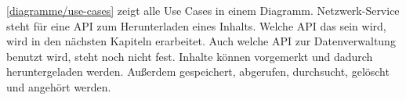 \autoref{diagramme/use-cases} zeigt alle Use Cases in einem Diagramm. Netzwerk-Service steht für eine \ac{API} zum Herunterladen eines Inhalts. Welche \ac{API} das sein wird, wird in den nächsten Kapiteln erarbeitet. Auch welche \ac{API} zur Datenverwaltung benutzt wird, steht noch nicht fest. Inhalte können vorgemerkt und dadurch heruntergeladen werden. Außerdem gespeichert, abgerufen, durchsucht, gelöscht und angehört werden.


